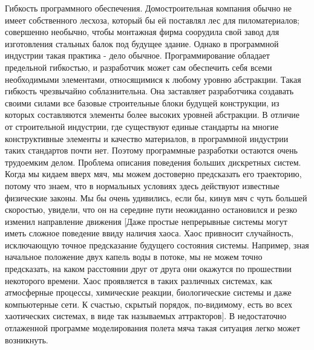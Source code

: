 \documentclass[11pt]{article}
\begin{document}
Гибкость программного обеспечения. Домостроительная компания обычно не имеет собственного лесхоза, который бы ей поставлял лес для пиломатериалов; совершенно необычно, чтобы монтажная фирма соорудила свой завод для изготовления стальных балок под будущее здание. Однако в программной индустрии такая практика - дело обычное. Программирование обладает предельной гибкостью, и разработчик может сам обеспечить себя всеми необходимыми элементами, относящимися к любому уровню абстракции. Такая гибкость чрезвычайно соблазнительна. Она заставляет разработчика создавать своими силами все базовые строительные блоки будущей конструкции, из которых составляются элементы более высоких уровней абстракции. В отличие от строительной индустрии, где существуют единые стандарты на многие конструктивные элементы и качество материалов, в программной индустрии таких стандартов почти нет. Поэтому программные разработки остаются очень трудоемким делом. 
Проблема описания поведения больших дискретных систем. Когда мы кидаем вверх мяч, мы можем достоверно предсказать его траекторию, потому что знаем, что в нормальных условиях здесь действуют известные физические законы. Мы бы очень удивились, если бы, кинув мяч с чуть большей скоростью, увидели, что он на середине пути неожиданно остановился и резко изменил направление движения [Даже простые непрерывные системы могут иметь сложное поведение ввиду наличия хаоса. Хаос привносит случайность, исключающую точное предсказание будущего состояния системы. Например, зная начальное положение двух капель воды в потоке, мы не можем точно предсказать, на каком расстоянии друг от друга они окажутся по прошествии некоторого времени. Хаос проявляется в таких различных системах, как атмосферные процессы, химические реакции, биологические системы и даже компьютерные сети. К счастью, скрытый порядок, по-видимому, есть во всех хаотических системах, в виде так называемых аттракторов]. В недостаточно отлаженной программе моделирования полета мяча такая ситуация легко может возникнуть. 
\end{document}
